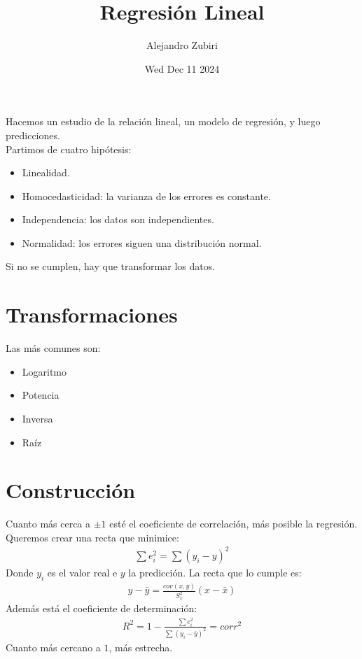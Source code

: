\documentclass{article}
\author{Alejandro Zubiri}
\date{Wed Dec 11 2024}
\title{Regresión Lineal}
\begin{document}
\maketitle
\tableofcontents
\pagebreak
Hacemos un estudio de la relación lineal, un modelo de regresión, y luego predicciones.\\
Partimos de cuatro hipótesis:
\begin{itemize}
    \item Linealidad.
    \item Homocedasticidad: la varianza de los errores es constante.
    \item Independencia: los datos son independientes.
    \item Normalidad: los errores siguen una distribución normal.
\end{itemize}
Si no se cumplen, hay que transformar los datos.
\section{Transformaciones}
Las más comunes son:
\begin{itemize}
    \item Logaritmo
    \item Potencia
    \item Inversa
    \item Raíz
\end{itemize}
\section{Construcción}
Cuanto más cerca a $\pm 1$ esté el coeficiente de correlación, más posible la regresión.\\
Queremos crear una recta que minimice:
\begin{equation}
    \begin{split}
        \sum e_{i}^{2} = \sum (y_{i}-y)^{2}
    \end{split}
\end{equation}
Donde $y_{i}$ es el valor real e $y$ la predicción. La recta que lo cumple es:
\begin{equation}
    \begin{split}
        \boxed{y-\bar{y} = \frac{cov(x,y)}{S_{x}^{2}}(x-\bar{x})}
    \end{split}
\end{equation}
Además está el coeficiente de determinación:
\begin{equation}
    \begin{split}
        R^{2}= 1-\frac{\sum e_{i}^{2}}{\sum (y_{i}-\bar{y})^{2}} = corr^{2}
    \end{split}
\end{equation}
Cuanto más cercano a $1$, más estrecha.
\end{document}
